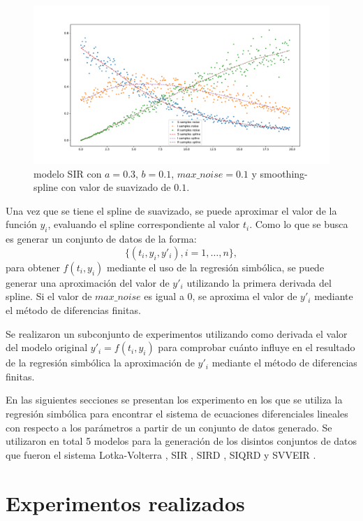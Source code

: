 \begin{figure}[h]
    \centering
    \includegraphics[width=\textwidth]{"figures/SIR_noise_with_spline.pdf"}
    \caption{modelo SIR con $a = 0.3$, $b = 0.1$, $max\_noise = 0.1$ y smoothing-spline con valor de suavizado de $0.1$.}
    \label{fig:SIR_noise_with_spline}
\end{figure}

Una vez que se tiene el spline de suavizado, se puede aproximar el valor de la función $y_i$, evaluando el spline correspondiente al valor $t_i$. Como lo que se busca es generar un conjunto de datos de la forma:
$$\{(t_i, y_i, y'_i), i=1, \dots, n\},$$
para obtener $f(t_i, y_i)$ mediante el uso de la regresión simbólica, se puede generar una aproximación del valor de $y'_i$ utilizando la primera derivada del spline. Si el valor de $max\_noise$ es igual a 0, se aproxima el valor de $y'_i$ mediante el método de diferencias finitas.

Se realizaron un subconjunto de experimentos utilizando como derivada el valor del modelo original $y'_i = f(t_i, y_i)$ para comprobar cuánto influye en el resultado de la regresión simbólica la aproximación de $y'_i$ mediante el método de diferencias finitas.

En las siguientes secciones se presentan los experimento en los que se utiliza la regresión simbólica para encontrar el sistema de ecuaciones diferenciales lineales con respecto a los parámetros a partir de un conjunto de datos generado. Se utilizaron en total 5 modelos para la generación de los disintos conjuntos de datos que fueron el sistema Lotka-Volterra \cite{Hoppensteadt:2006}, SIR \cite{weiss2013sir}, SIRD \cite{bailey1975mathematical}, SIQRD \cite{molter2021mathematical} y SVVEIR \cite{kuddus2021mathematical}.

\section{Experimentos realizados}\label{section:experiments}

